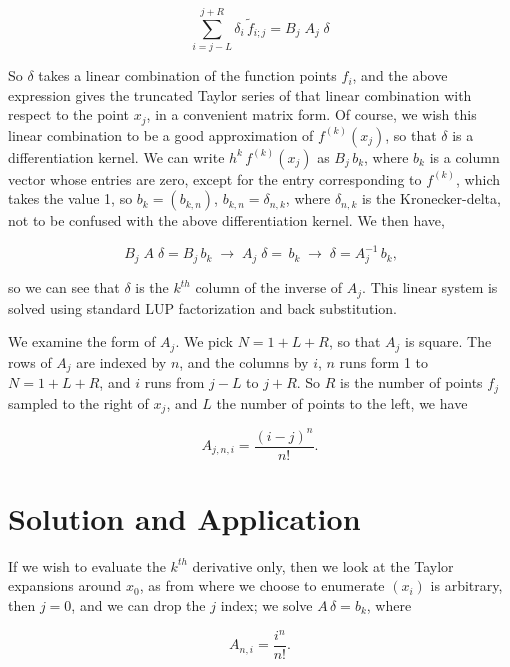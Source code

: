 \documentclass[amsmath,amssymb,floatfix]{revtex4}
\numberwithin{equation}{section}
\begin{document}
\begin{equation}
\sum_{i=j-L}^{j+R} \delta_i \, \tilde{f}_{i;j}  =   B_j  \; A_j \; \delta
\end{equation}

So $\delta$ takes a linear combination of the function points $f_i$, and the above expression gives the truncated Taylor series of that linear combination with respect to the point $x_j$, in a convenient matrix form. Of course, we wish this linear combination to be a good approximation of $f^{(k)} (x_j)$, so that $\delta$ is a differentiation kernel. We can write $h ^k \, f^{(k)} (x_j)$ as $B_j \, b_k$, where $b_k$ is a column vector whose entries are zero, except for the entry corresponding to $f^{(k)}$, which takes the value 1, so $b_k = (b_{k,n})$, $b_{k,n} = \delta_{n,k}$, where $\delta_{n,k}$ is the Kronecker-delta, not to be confused with the above differentiation kernel. We then have,

\begin{equation}
\ B_j  \; A \; \delta = B_j \, b_k \;  \rightarrow \; A_j \; \delta = \, b_k  \; \rightarrow \; \delta =  A_j ^{-1} \, b_k,
\end{equation}

\noindent
so we can see that $\delta$ is the $k^{th}$ column of the inverse of $A_j$. This linear system is solved using standard LUP factorization and back substitution.

We examine the form of $A_j$. We pick $N = 1+L+R$, so that $A_j$ is square. The rows of $A_j$ are indexed by $n$, and the columns by $i$, $n$ runs form 1 to $N = 1+L+R$, and $i$ runs from $j-L$ to $j+R$. So $R$ is the number of points $f_j$ sampled to the right of $x_j$, and $L$ the number of points to the left, we have

\begin{equation}
A_{j,n,i} = \frac{(i-j)^n}{n!}.
\end{equation}

\section{\label{sec:level1}Solution and Application\protect}

\noindent
If we wish to evaluate the $k^{th}$ derivative only, then we look at the Taylor expansions around $x_0$, as from where we choose to enumerate $(x_i)$ is arbitrary, then $j = 0$, and we can drop the $j$ index; we solve $A \, \delta = b_k$, where

\begin{equation}
A_{n,i} = \frac{i^n}{n!}.
\end{equation}
\end{document}
